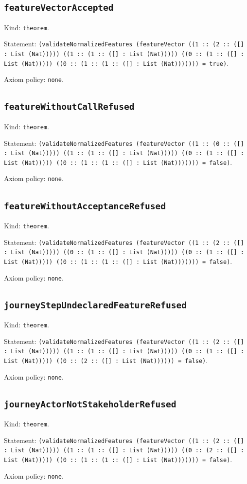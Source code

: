 \documentclass[11pt]{article}
\begin{document}
\subsection*{\texttt{featureVectorAccepted}}
\noindent Kind: \texttt{theorem}.\par
\noindent Statement: \texttt{(validateNormalizedFeatures (featureVector ((1 :: (2 :: ([] : List (Nat))))) ((1 :: (1 :: ([] : List (Nat))))) ((0 :: (1 :: ([] : List (Nat))))) ((0 :: (1 :: (1 :: ([] : List (Nat))))))) = true)}.\par
\noindent Axiom policy: \texttt{none}.\par
\subsection*{\texttt{featureWithoutCallRefused}}
\noindent Kind: \texttt{theorem}.\par
\noindent Statement: \texttt{(validateNormalizedFeatures (featureVector ((1 :: (0 :: ([] : List (Nat))))) ((1 :: (1 :: ([] : List (Nat))))) ((0 :: (1 :: ([] : List (Nat))))) ((0 :: (1 :: (1 :: ([] : List (Nat))))))) = false)}.\par
\noindent Axiom policy: \texttt{none}.\par
\subsection*{\texttt{featureWithoutAcceptanceRefused}}
\noindent Kind: \texttt{theorem}.\par
\noindent Statement: \texttt{(validateNormalizedFeatures (featureVector ((1 :: (2 :: ([] : List (Nat))))) ((0 :: (1 :: ([] : List (Nat))))) ((0 :: (1 :: ([] : List (Nat))))) ((0 :: (1 :: (1 :: ([] : List (Nat))))))) = false)}.\par
\noindent Axiom policy: \texttt{none}.\par
\subsection*{\texttt{journeyStepUndeclaredFeatureRefused}}
\noindent Kind: \texttt{theorem}.\par
\noindent Statement: \texttt{(validateNormalizedFeatures (featureVector ((1 :: (2 :: ([] : List (Nat))))) ((1 :: (1 :: ([] : List (Nat))))) ((0 :: (1 :: ([] : List (Nat))))) ((0 :: (2 :: ([] : List (Nat)))))) = false)}.\par
\noindent Axiom policy: \texttt{none}.\par
\subsection*{\texttt{journeyActorNotStakeholderRefused}}
\noindent Kind: \texttt{theorem}.\par
\noindent Statement: \texttt{(validateNormalizedFeatures (featureVector ((1 :: (2 :: ([] : List (Nat))))) ((1 :: (1 :: ([] : List (Nat))))) ((0 :: (2 :: ([] : List (Nat))))) ((0 :: (1 :: (1 :: ([] : List (Nat))))))) = false)}.\par
\noindent Axiom policy: \texttt{none}.\par
\end{document}
